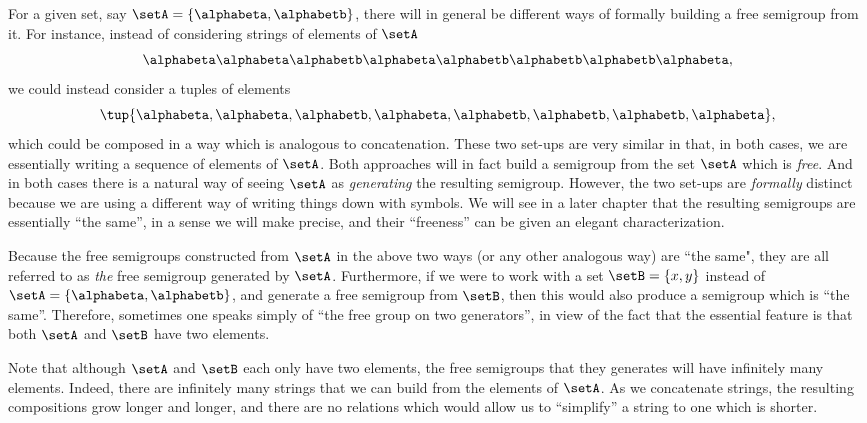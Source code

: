 For a given set, say $\setA = \{ \alphabeta, \alphabetb\}$, there will in general be different ways of formally building a free semigroup from it. For instance, instead of considering strings of elements of $\setA$ 
\begin{equation}  
    \alphabeta\alphabeta \alphabetb \alphabeta \alphabetb \alphabetb \alphabetb \alphabeta,
  \end{equation}
 we could instead consider a tuples of elements 
\begin{equation}  
   \tup{ \alphabeta, \alphabeta,  \alphabetb,  \alphabeta,  \alphabetb,  \alphabetb,  \alphabetb,  \alphabeta},
  \end{equation}
which could be composed in a way which is analogous to concatenation. These two set-ups are very similar in that, in both cases, we are essentially writing a sequence of elements of $\setA$. Both approaches will in fact build a semigroup from the set $\setA$ which is \emph{free}. And in both cases there is a natural way of seeing $\setA$ as \emph{generating} the resulting semigroup. However, the two set-ups are \emph{formally} distinct because we are using a different way of writing things down with symbols. We will see in a later chapter that the resulting semigroups are essentially ``the same'', in a sense we will make precise, and their ``freeness'' can be given an elegant characterization. 

Because the free semigroups constructed from $\setA$ in the above two ways (or any other analogous way) are ``the same", they are all referred to as \emph{the} free semigroup generated by $\setA$. Furthermore, if we were to work with a set $\setB = \{ x, y \}$ instead of $\setA = \{ \alphabeta, \alphabetb\}$, and generate a free semigroup from $\setB$, then this would also produce a semigroup which is ``the same''. Therefore, sometimes one speaks simply of ``the free group on two generators'', in view of the fact that the essential feature is that both $\setA$ and $\setB$ have two elements. 

Note that although $\setA$ and $\setB$ each only have two elements, the free semigroups that they generates will have infinitely many elements. Indeed, there are infinitely many strings that we can build from the elements of $\setA$. As we concatenate strings, the resulting compositions grow longer and longer, and there are no relations which would allow us to ``simplify'' a string to one which is shorter. 
 


